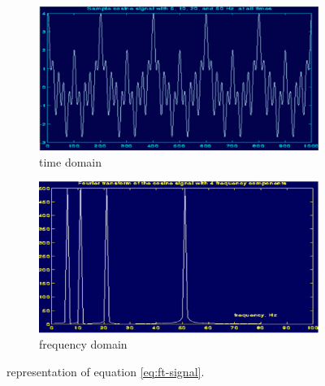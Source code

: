 \documentclass[12pt, a4paper, twoside]{report}
\begin{document}
\begin{figure}[!h]
    \centering
    \begin{subfigure}[b]{0.7\textwidth}
        \includegraphics[width=\textwidth]
        {images/chapter3/ft-signal-time}
        \caption{time domain}
        \label{fig:ft-signal-time}
    \end{subfigure}

    \begin{subfigure}[b]{0.7\textwidth}
        \includegraphics[width=\textwidth]
        {images/chapter3/ft-signal-freq}
        \caption{frequency domain}
        \label{fig:ft-signal-freq}
    \end{subfigure}
    \caption{representation of equation \ref{eq:ft-signal}.}
    \label{fig:ft-signal}
\end{figure}
\end{document}
